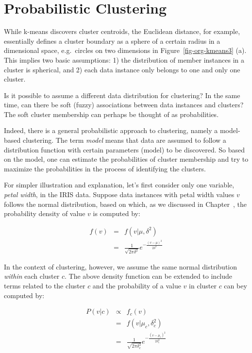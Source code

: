 \documentclass[
  letterpaper,
]{scrbook}
\begin{document}
\section{Probabilistic Clustering}\label{probabilistic-clustering}

While k-means discovers cluster centroids, the Euclidean distance, for
example, essentially defines a cluster boundary as a sphere of a certain
radius in a dimensional space, e.g.~circles on two dimensions in
Figure~\ref{fig-org-kmeans3} (a). This implies two basic assumptions: 1)
the distribution of member instances in a cluster is spherical, and 2)
each data instance only belongs to one and only one cluster.

Is it possible to assume a different data distribution for clustering?
In the same time, can there be soft (fuzzy) associations between data
instances and clusters? The soft cluster membership can perhaps be
thought of as probabilities.

Indeed, there is a general probabilistic approach to clustering, namely
a model-based clustering. The term \emph{model} means that data are
assumed to follow a distribution function with certain parameters
(model) to be discovered. So based on the model, one can estimate the
probabilities of cluster membership and try to maximize the
probabilities in the process of identifying the clusters.

For simpler illustration and explanation, let's first consider only one
variable, \emph{petal width}, in the IRIS data. Suppose data instances
with petal width values \(v\) follows the normal distribution, based on
which, as we discussed in Chapter~, the probability density of value
\(v\) is computed by:

\[\begin{aligned}
  f(v)
  & = & f(v|\mu,\delta^2) \\
  & = & \frac{1}{\sqrt{2\pi\delta^2}} e^{-\frac{(v-\mu)^2}{2\delta^2}}
\end{aligned}\]

In the context of clustering, however, we assume the same normal
distribution \emph{within} each cluster \(c\). The above density
function can be extended to include terms related to the cluster \(c\)
and the probability of a value \(v\) in cluster \(c\) can bey computed
by:

\[\begin{aligned}
  P(v|c)
  & \propto & f_{c}(v) \\
  & = & f(v|\mu_c,\delta_c^2) \\
  & = & \frac{1}{\sqrt{2\pi\delta_c^2}} e^{-\frac{(v-\mu_c)^2}{2\delta_c^2}}
\end{aligned}\]
\end{document}
